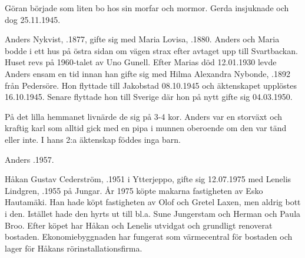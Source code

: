 Göran började som liten bo hos sin morfar och mormor. Gerda insjuknade och dog 25.11.1945.





Anders Nykvist, .1877, gifte sig med Maria Lovisa, .1880. Anders och Maria bodde i ett hus på östra sidan om vägen strax efter avtaget upp till Svartbackan. Huset revs på 1960-talet av Uno Gunell. Efter Marias död 12.01.1930 levde Anders ensam en tid innan han gifte sig med Hilma Alexandra Nybonde, .1892 från Pedersöre. Hon flyttade till Jakobstad 08.10.1945 och äktenskapet upplöstes 16.10.1945. Senare flyttade hon till Sverige där hon på nytt gifte sig 04.03.1950.

På det lilla hemmanet livnärde de sig på 3-4 kor. Anders var en storväxt och kraftig karl som alltid gick med en pipa i munnen oberoende om den var tänd eller inte. I hans 2:a äktenskap föddes inga barn.
\begin{jhchildren}
  \item {}
  \item {}
  \item {}
  \item {}
  \item {}
  \item {}
\end{jhchildren}

Anders .1957.






Håkan Gustav Cederström, .1951 i Ytterjeppo, gifte sig 12.07.1975 med Lenelis Lindgren, .1955 på Jungar. År 1975 köpte makarna fastigheten av Esko Hautamäki. Han hade köpt fastigheten av Olof och Gretel Laxen, men aldrig bott i den. Istället hade den hyrts ut till bl.a. Sune Jungerstam och Herman och Paula Broo. Efter köpet har Håkan och Lenelis utvidgat och grundligt renoverat bostaden. Ekonomiebyggnaden har fungerat som värmecentral för bostaden och lager för Håkans rörinstallationsfirma.

